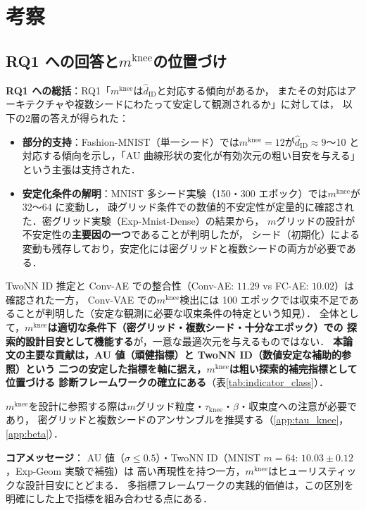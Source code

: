 \documentclass[11pt,a4paper]{jsarticle}
\newcommand{\mknee}{m^{\mathrm{knee}}}
\begin{document}
\section{考察}\label{sec:discussion}

\subsection{RQ1 への回答と$\mknee$の位置づけ}\label{sec:disc_mknee}

\textbf{RQ1 への総括}：RQ1「$\mknee$は$\hat{d}_\mathrm{ID}$と対応する傾向があるか，
またその対応はアーキテクチャや複数シードにわたって安定して観測されるか」に対しては，
以下の2層の答えが得られた：

\begin{itemize}
  \item \textbf{部分的支持}：Fashion-MNIST（単一シード）では$\mknee = 12$が$\hat{d}_\mathrm{ID} \approx 9$〜10
        と対応する傾向を示し，「AU 曲線形状の変化が有効次元の粗い目安を与える」という主張は支持された．
  \item \textbf{安定化条件の解明}：MNIST 多シード実験（150・300 エポック）では$\mknee$が 32〜64 に変動し，
        疎グリッド条件での数値的不安定性が定量的に確認された．密グリッド実験（Exp-Mnist-Dense）の結果から，
        $m$グリッドの設計が不安定性の\textbf{主要因の一つ}であることが判明したが，
        シード（初期化）による変動も残存しており，安定化には密グリッドと複数シードの両方が必要である．
\end{itemize}

TwoNN ID 推定と Conv-AE での整合性（Conv-AE: $11.29$ vs FC-AE: $10.02$）は確認された一方，
Conv-VAE での$\mknee$検出には 100 エポックでは収束不足であることが判明した（安定な観測に必要な収束条件の特定という知見）．
全体として，\textbf{$\mknee$は適切な条件下（密グリッド・複数シード・十分なエポック）での
探索的設計目安として機能する}が，一意な最適次元を与えるものではない．
\textbf{本論文の主要な貢献は，AU 値（頑健指標）と TwoNN ID（数値安定な補助的参照）という
二つの安定した指標を軸に据え，$\mknee$は粗い探索的補完指標として位置づける
診断フレームワークの確立にある}（表\ref{tab:indicator_class}）．

$\mknee$を設計に参照する際は$m$グリッド粒度・$\tau_\mathrm{knee}$・$\beta$・収束度への注意が必要であり，
密グリッドと複数シードのアンサンブルを推奨する（\ref{app:tau_knee}，\ref{app:beta}）．

\textbf{コアメッセージ}：
AU 値（$\sigma \leq 0.5$）・TwoNN ID（MNIST $m=64$: $10.03 \pm 0.12$，Exp-Geom 実験で補強）は
高い再現性を持つ一方，$\mknee$はヒューリスティックな設計目安にとどまる．
多指標フレームワークの実践的価値は，この区別を明確にした上で指標を組み合わせる点にある．
\end{document}
